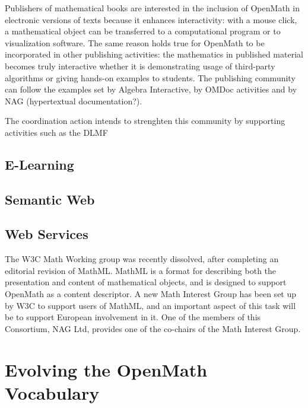\documentclass[draft]{artikel3}
\begin{document}
Publishers of mathematical books are interested in the inclusion of
OpenMath in electronic versions of texts because it enhances
interactivity: with a mouse click, a mathematical object can be
transferred to a computational program or to visualization software.
The same reason holds true for OpenMath to be incorporated in other
publishing activities: the mathematics in published material becomes
truly interactive whether it is demonstrating usage of third-party
algorithms or giving hands-on examples to students. The publishing
community can follow the examples set by Algebra Interactive, by OMDoc
activities and by NAG (hypertextual documentation?).

The coordination action intends to strenghten this community by
supporting activities such as the DLMF


\subsection{E-Learning}
\label{sec:e-learn}


\subsection{Semantic Web}
\label{sec:semw}


\subsection{Web Services}
\label{sec:ws}





The W3C Math Working group was recently dissolved, after completing an
editorial revision of MathML.  MathML is a format for describing both
the presentation and content of mathematical objects, and is designed
to support OpenMath as a content descriptor.  A new Math Interest
Group has been set up by W3C to support users of MathML, and an
important aspect of this task will be to support European involvement
in it.  One of the members of this Consortium, NAG Ltd, provides one
of the co-chairs of the Math Interest Group.

\section{Evolving the OpenMath Vocabulary}
\label{sec:OCD}
\end{document}
